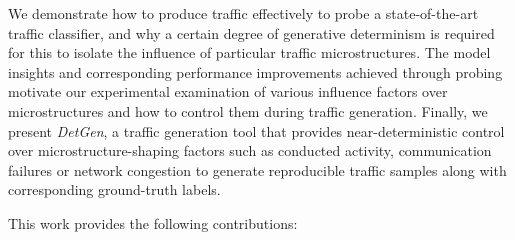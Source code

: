 \documentclass[runningheads]{llncs}
\begin{document}
We demonstrate how to produce traffic effectively to probe a state-of-the-art traffic classifier, and why a certain degree of generative determinism is required for this to isolate the influence of particular traffic microstructures. The model insights and corresponding performance improvements achieved through probing motivate our experimental examination of various influence factors over microstructures and how to control them during traffic generation. Finally, we present \emph{DetGen}, a traffic generation tool that provides near-deterministic control over microstructure-shaping factors such as conducted activity, communication failures or network congestion to generate reproducible traffic samples along with corresponding ground-truth labels. %




 
This work provides the following contributions:
\end{document}
